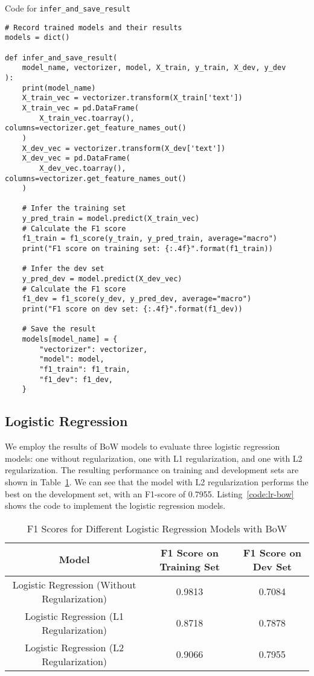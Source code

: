 \documentclass{article}
\begin{document}
\begin{listing}[H]
\caption{Code for \texttt{infer\_and\_save\_result}}
\label{code:infer-save}
\begin{verbatim}
# Record trained models and their results
models = dict()

def infer_and_save_result(
    model_name, vectorizer, model, X_train, y_train, X_dev, y_dev
):
    print(model_name)
    X_train_vec = vectorizer.transform(X_train['text'])
    X_train_vec = pd.DataFrame(
        X_train_vec.toarray(), columns=vectorizer.get_feature_names_out()
    )
    X_dev_vec = vectorizer.transform(X_dev['text'])
    X_dev_vec = pd.DataFrame(
        X_dev_vec.toarray(), columns=vectorizer.get_feature_names_out()
    )

    # Infer the training set
    y_pred_train = model.predict(X_train_vec)
    # Calculate the F1 score
    f1_train = f1_score(y_train, y_pred_train, average="macro")
    print("F1 score on training set: {:.4f}".format(f1_train))

    # Infer the dev set
    y_pred_dev = model.predict(X_dev_vec)
    # Calculate the F1 score
    f1_dev = f1_score(y_dev, y_pred_dev, average="macro")
    print("F1 score on dev set: {:.4f}".format(f1_dev))

    # Save the result
    models[model_name] = {
        "vectorizer": vectorizer,
        "model": model,
        "f1_train": f1_train,
        "f1_dev": f1_dev,
    }
\end{verbatim}
\end{listing}


\subsection{Logistic Regression}

We employ the results of BoW models to evaluate three logistic regression models: one without regularization, one with L1 regularization, and one with L2 regularization. The resulting performance on training and development sets are shown in Table~\ref{tab:results-lr-bow}. We can see that the model with L2 regularization performs the best on the development set, with an F1-score of 0.7955. Listing~\ref{code:lr-bow} shows the code to implement the logistic regression models.

\begin{table}[h]
    \centering
    \begin{tabular}{|c|c|c|}
        \hline
        \textbf{Model} & \textbf{F1 Score on Training Set} & \textbf{F1 Score on Dev Set} \\
        \hline
        Logistic Regression (Without Regularization) & 0.9813 & 0.7084 \\
        \hline
        Logistic Regression (L1 Regularization) & 0.8718 & 0.7878 \\
        \hline
        Logistic Regression (L2 Regularization) & 0.9066 & 0.7955 \\
        \hline
    \end{tabular}
    \caption{F1 Scores for Different Logistic Regression Models with BoW}
    \label{tab:results-lr-bow}
\end{table}
\end{document}
